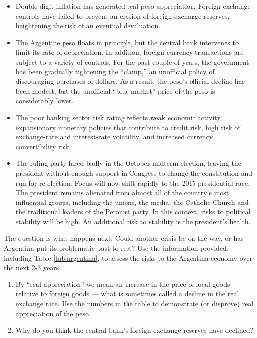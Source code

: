 \begin{enumerate}
\begin{itemize}
\item Double-digit inflation has generated real peso appreciation.
Foreign-exchange controls have failed to prevent an erosion of
foreign exchange reserves,
heightening the risk of an eventual devaluation.

\item The Argentine peso floats in principle, but the central bank intervenes to limit
its rate of depreciation.
In addition, foreign currency transactions are subject to a variety of controls.
For the past couple of years, the government has
been gradually tightening the ``clamp,''
an unofficial policy of discouraging purchases of dollars.
As a result, the peso's official decline has been modest,
but the unofficial ``blue market'' price of the peso is considerably lower.

\item The poor banking sector risk rating reflects weak economic activity, expansionary
monetary policies that contribute to credit risk, high risk of exchange-rate
and interest-rate volatility, and increased currency convertibility risk.

\item The ruling party fared badly in the October midterm election,
 leaving the president without enough support in Congress
 to change the constitution and run for re-election.
 Focus will now shift rapidly to the 2015 presidential race.
 The president remains alienated from almost all of the country's most influential groups,
including the unions, the media, the Catholic Church and the traditional
leaders of the Peronist party. In this context, risks to political stability will be
high. An additional risk to stability is the president's health.
\end{itemize}
%
The question is what happens next:  Could another crisis be on the way,
or has Argentina put its problematic past to rest?
Use the information provided,
including Table \ref{tab:argentina}, 
to assess the risks to the Argentina economy over the next 2-3 years.
%
\begin{enumerate}
\item By ``real appreciation'' we mean an increase in the price
of local goods relative to foreign goods ---
what is sometimes called a decline in the real exchange rate.
Use the numbers in the table to demonstrate (or disprove) real appreciation
of the peso.

\item Why do you think the central bank's foreign exchange reserves have declined?


\end{enumerate}
\end{enumerate}
